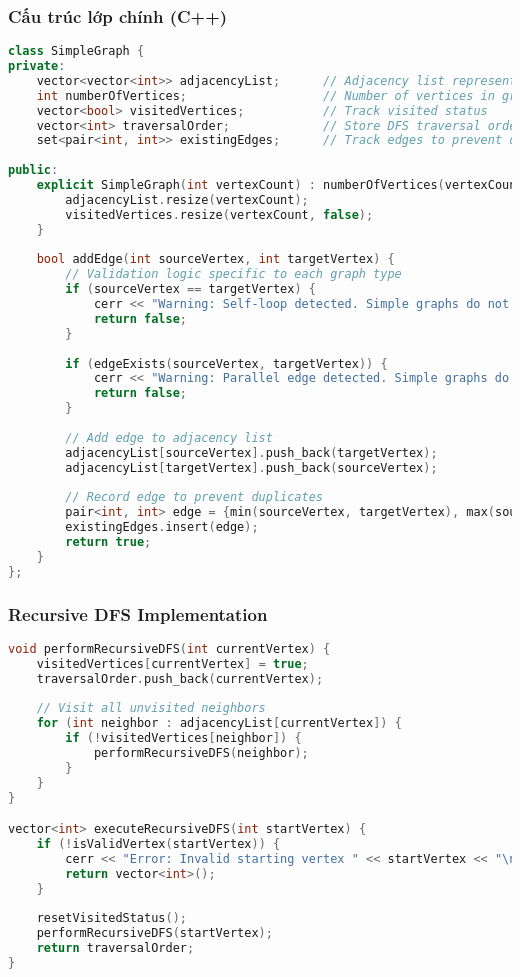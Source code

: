 \documentclass[12pt]{article}
\begin{document}
\subsubsection*{Cấu trúc lớp chính (C++)}
\begin{lstlisting}[language=C++, basicstyle=\ttfamily\footnotesize, frame=single]
class SimpleGraph {
private:
    vector<vector<int>> adjacencyList;      // Adjacency list representation
    int numberOfVertices;                   // Number of vertices in graph
    vector<bool> visitedVertices;           // Track visited status
    vector<int> traversalOrder;             // Store DFS traversal order
    set<pair<int, int>> existingEdges;      // Track edges to prevent duplicates
    
public:
    explicit SimpleGraph(int vertexCount) : numberOfVertices(vertexCount) {
        adjacencyList.resize(vertexCount);
        visitedVertices.resize(vertexCount, false);
    }
    
    bool addEdge(int sourceVertex, int targetVertex) {
        // Validation logic specific to each graph type
        if (sourceVertex == targetVertex) {
            cerr << "Warning: Self-loop detected. Simple graphs do not support self-loops.\n";
            return false;
        }
        
        if (edgeExists(sourceVertex, targetVertex)) {
            cerr << "Warning: Parallel edge detected. Simple graphs do not support parallel edges.\n";
            return false;
        }
        
        // Add edge to adjacency list
        adjacencyList[sourceVertex].push_back(targetVertex);
        adjacencyList[targetVertex].push_back(sourceVertex);
        
        // Record edge to prevent duplicates
        pair<int, int> edge = {min(sourceVertex, targetVertex), max(sourceVertex, targetVertex)};
        existingEdges.insert(edge);
        return true;
    }
};
\end{lstlisting}

\subsubsection*{Recursive DFS Implementation}
\begin{lstlisting}[language=C++, basicstyle=\ttfamily\footnotesize, frame=single]
void performRecursiveDFS(int currentVertex) {
    visitedVertices[currentVertex] = true;
    traversalOrder.push_back(currentVertex);
    
    // Visit all unvisited neighbors
    for (int neighbor : adjacencyList[currentVertex]) {
        if (!visitedVertices[neighbor]) {
            performRecursiveDFS(neighbor);
        }
    }
}

vector<int> executeRecursiveDFS(int startVertex) {
    if (!isValidVertex(startVertex)) {
        cerr << "Error: Invalid starting vertex " << startVertex << "\n";
        return vector<int>();
    }
    
    resetVisitedStatus();
    performRecursiveDFS(startVertex);
    return traversalOrder;
}
\end{lstlisting}
\end{document}
